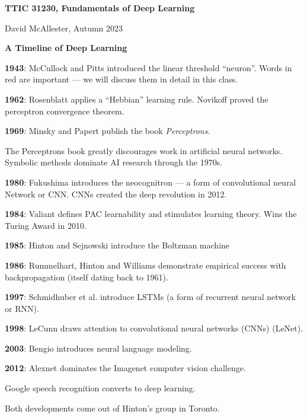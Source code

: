 




{\Huge
  \centerline{\bf TTIC 31230,  Fundamentals of Deep Learning}
  \vfill
  \centerline{David McAllester, Autumn 2023}
  \vfill
  \centerline{\bf A Timeline of Deep Learning}
\vfill
\vfill



{\bf 1943}: McCullock and Pitts introduced the {\color{red} linear threshold ``neuron''}. Words in red are important --- we will discuss them in detail in this class.

\vfill
{\bf 1962}: Rosenblatt applies a ``Hebbian'' learning rule.  Novikoff proved the perceptron convergence theorem.

\vfill
{\bf 1969}: Minsky and Papert publish the book {\it Perceptrons}.

\vfill
The Perceptrons book greatly discourages work in artificial neural networks.  Symbolic methods dominate AI research through the 1970s.


{\bf 1980}: Fukushima introduces the neocognitron --- a form of {\color{red} convolutional neural Network or CNN}.  CNNs created the deep revolution in 2012.

\vfill
{\bf 1984}: Valiant defines PAC learnability and stimulates learning theory. Wins the Turing Award in 2010.

\vfill
{\bf 1985}: Hinton and Sejnowski introduce the Boltzman machine

\vfill
{\bf 1986}: Rummelhart, Hinton and Williams demonstrate empirical success with {\color{red} backpropagation} (itself dating back to 1961).


{\bf 1997}: Schmidhuber et al. introduce LSTMs (a form of {\color{red} recurrent neural network or RNN}).

\vfill
{\bf 1998}: LeCunn draws attention to convolutional neural networks (CNNs) (LeNet).

\vfill
{\bf 2003}: Bengio introduces {\color{red} neural language modeling}.


{\bf 2012}: Alexnet dominates the Imagenet computer vision challenge.

\vfill
Google speech recognition converts to deep learning.

\vfill
Both developments come out of Hinton's group in Toronto.

}

